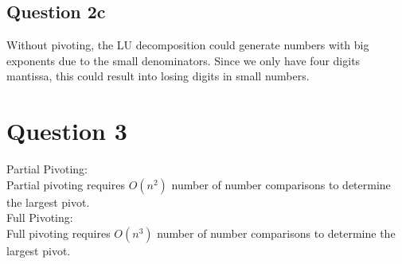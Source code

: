 \documentclass[11pt]{article} %
\begin{document}
\subsection{Question 2c}
Without pivoting, the LU decomposition could generate numbers with big exponents due to the small denominators. Since we only have four digits mantissa, this could result into losing digits in small numbers.

\section{Question 3}
Partial Pivoting:\\
Partial pivoting requires $O(n^{2})$  number of number comparisons to determine the largest pivot. \\\linebreak
Full Pivoting:\\
Full pivoting requires $O(n^{3})$ number of number comparisons to determine the largest pivot.
\end{document}

